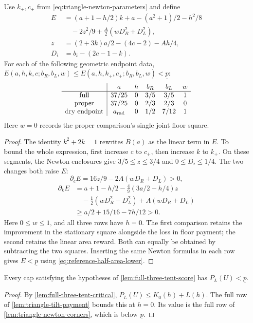 \begin{lemma}\label{lem:triangle-newton-corners}
Use $k_+,c_+$ from \eqref{eq:triangle-newton-parameters} and define
\[
\begin{aligned}
 E&=(a+1-h/2)k+a-(a^2+1)/2-h^2/8\\
  &\quad-2z^2/9+\tfrac A2(wD_R^2+D_L^2),\\
 z&=(2+3k)a/2-(4c-2)-Ah/4,\\
 D_i&=b_i-(2c-1-k).
\end{aligned}
\]
For each of the following geometric endpoint data,
$E(a,h,k,c;b_R,b_L,w)\le E(a,h,k_+,c_+;b_R,b_L,w)<\underline p$:
\[
\begin{array}{c|ccccc}
 &a&h&b_R&b_L&w\\ \hline
 \text{full}&37/25&0&3/5&3/5&1\\
 \text{proper}&37/25&0&2/3&2/3&0\\
 \text{dry endpoint}&a_{\rm rad}&0&1/2&7/12&1
\end{array}
\]
Here $w=0$ records the proper comparison's single joint floor square.
\end{lemma}
\begin{proof}
The identity $k^2+2k=1$ rewrites $B(a)$ as the linear term in
$E$. To bound the whole expression, first increase $c$ to $c_+$,
then increase $k$ to $k_+$. On these segments, the Newton enclosures
give $3/5\le z\le3/4$ and $0\le D_i\le1/4$.
The two changes both raise $E$:
\[
 \partial_cE=16z/9-2A(wD_R+D_L)>0,
\]
\[
\begin{aligned}
 \partial_kE&=a+1-h/2-\tfrac49(3a/2+h/4)z\\
 &\quad-\tfrac12(wD_R^2+D_L^2)+A(wD_R+D_L)\\
 &\ge a/2+15/16-7h/12>0.
\end{aligned}
\]
Here $0\le w\le1$, and all three rows have $h=0$.
The first comparison retains the improvement in the stationary square
alongside the loss in floor payment; the second retains the linear
area reward. Both can equally be obtained by subtracting the two
squares. Inserting the same Newton formulas in each row gives
$E<\underline p$ using \eqref{eq:reference-half-area-lower}.
\end{proof}

\begin{corollary}\label{cor:full-three-tent-cut}
Every cap satisfying the hypotheses of
\cref{lem:full-three-tent-score} has $P_L(U)<\underline p$.
\end{corollary}
\begin{proof}
By \cref{lem:full-three-tent-critical},
$P_L(U)\le K_0(h)+L(h)$.
The full row of \cref{lem:triangle-tilt-payment} bounds this at $h=0$.
Its value is the full row of \cref{lem:triangle-newton-corners},
which is below $\underline p$.
\end{proof}

